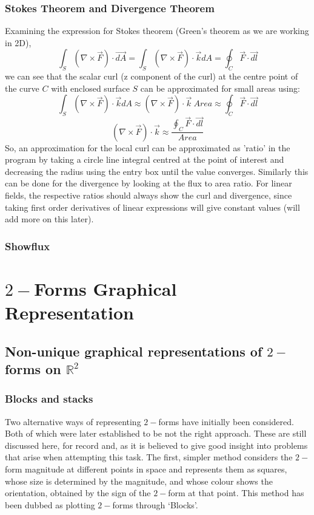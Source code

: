 \documentclass[12pt]{report}
\begin{document}
\subsection{Stokes Theorem and Divergence Theorem}
Examining the expression for Stokes theorem (Green's theorem as we are working in 2D),
\begin{equation}
	\int_{S} (\nabla \times \vec{F}) \cdot \vec{dA} = \int_{S} (\nabla \times \vec{F}) \cdot \vec{k} dA = \oint_{C} \vec{F} \cdot \vec{dl}
\end{equation}
we can see that the scalar curl (z component of the curl) at the centre point of the curve $C$ with enclosed surface $S$ can be approximated for small areas using: 
\begin{equation}
	\int_{S} (\nabla \times \vec{F}) \cdot \vec{k} dA \approx (\nabla \times \vec{F}) \cdot \vec{k} \ Area \approx \oint_{C} \vec{F} \cdot \vec{dl}
\end{equation}
\begin{equation}
	(\nabla \times \vec{F}) \cdot \vec{k} \approx \frac{\oint_{C} \vec{F} \cdot \vec{dl}}{Area}
\end{equation}
So, an approximation for the local curl can be approximated as 'ratio' in the program by taking a circle line integral centred at the point of interest and decreasing the radius using the entry box until the value converges. Similarly this can be done for the divergence by looking at the flux to area ratio. For linear fields, the respective ratios should always show the curl and divergence, since taking first order derivatives of linear expressions will give constant values (will add more on this later).

\subsection{Showflux}


\chapter{$2-$Forms Graphical Representation}

\section{Non-unique graphical representations of $2-$forms on $\mathbb{R}^{2}$}
\subsection{Blocks and stacks}
Two alternative ways of representing $2-$forms have initially been considered. Both of which were later established to be not the right approach. These are still discussed here, for record and, as it is believed to give good insight into problems that arise when attempting this task. 
The first, simpler method considers the $2-$form magnitude at different points in space and represents them as squares, whose size is determined by the magnitude, and whose colour shows the orientation, obtained by the sign of the $2-$form at that point. This method has been dubbed as plotting $2-$forms through `Blocks'.
\end{document}
